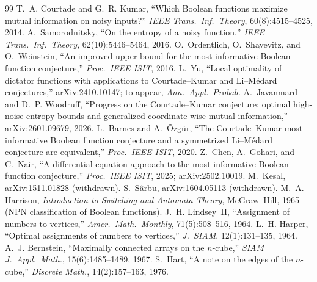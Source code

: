\documentclass[12pt,draftclsnofoot,onecolumn,journal]{IEEEtran}
\begin{document}
\begin{thebibliography}{99}
 T.~A. Courtade and G.~R. Kumar, ``Which Boolean functions
maximize mutual information on noisy inputs?'' \emph{IEEE Trans.\ Inf.\
Theory}, 60(8):4515--4525, 2014.
 A.~Samorodnitsky, ``On the entropy of a noisy
function,'' \emph{IEEE Trans.\ Inf.\ Theory}, 62(10):5446--5464, 2016.
\bibitem{OSW16} O.~Ordentlich, O.~Shayevitz, and O.~Weinstein, ``An improved
upper bound for the most informative Boolean function conjecture,''
\emph{Proc.\ IEEE ISIT}, 2016.
 L.~Yu, ``Local optimality of dictator functions with
applications to Courtade--Kumar and Li--M\'edard conjectures,''
arXiv:2410.10147; to appear, \emph{Ann.\ Appl.\ Probab.}
 A.~Javanmard and D.~P. Woodruff, ``Progress on the
Courtade--Kumar conjecture: optimal high-noise entropy bounds and
generalized coordinate-wise mutual information,'' arXiv:2601.09679, 2026.
\bibitem{BO20} L.~Barnes and A.~\"Ozg\"ur, ``The Courtade--Kumar most
informative Boolean function conjecture and a symmetrized Li--M\'edard
conjecture are equivalent,'' \emph{Proc.\ IEEE ISIT}, 2020.
 Z.~Chen, A.~Gohari, and C.~Nair, ``A differential equation
approach to the most-informative Boolean function conjecture,''
\emph{Proc.\ IEEE ISIT}, 2025; arXiv:2502.10019.
 M.~Kesal, arXiv:1511.01828 (withdrawn).
 S.~S\^arbu, arXiv:1604.05113 (withdrawn).
 M.~A. Harrison, \emph{Introduction to Switching and
Automata Theory}, McGraw--Hill, 1965 (NPN classification of Boolean
functions).
 J.~H. Lindsey~II, ``Assignment of numbers to vertices,''
\emph{Amer.\ Math.\ Monthly}, 71(5):508--516, 1964.
 L.~H. Harper, ``Optimal assignments of numbers to
vertices,'' \emph{J.\ SIAM}, 12(1):131--135, 1964.
 A.~J. Bernstein, ``Maximally connected arrays on the
$n$-cube,'' \emph{SIAM J.\ Appl.\ Math.}, 15(6):1485--1489, 1967.
\bibitem{Hart76} S.~Hart, ``A note on the edges of the $n$-cube,''
\emph{Discrete Math.}, 14(2):157--163, 1976.
\end{thebibliography}
\end{document}
